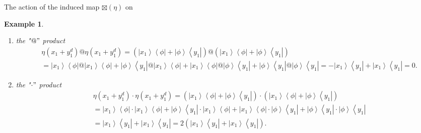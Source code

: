 \documentclass[aps,preprint]{revtex4}%
\newtheorem{example}[theorem]{Example}
\begin{document}
The action of the induced map $\boxtimes\left(  \eta\right)  $ on

\begin{example}
\begin{enumerate}
\item the "$@"$ product
\begin{align}
&  \eta\left(  x_{1}+y_{1}^{d}\right)  @\eta\left(  x_{1}+y_{1}^{d}\right)
=\left(  \left\vert x_{1}\right\rangle \left\langle \phi\right\vert
+\left\vert \phi\right\rangle \left\langle y_{1}\right\vert \right)  @\left(
\left\vert x_{1}\right\rangle \left\langle \phi\right\vert +\left\vert
\phi\right\rangle \left\langle y_{1}\right\vert \right) \\
&  =\left\vert x_{1}\right\rangle \left\langle \phi\right\vert @\left\vert
x_{1}\right\rangle \left\langle \phi\right\vert +\left\vert \phi\right\rangle
\left\langle y_{1}\right\vert @\left\vert x_{1}\right\rangle \left\langle
\phi\right\vert +\left\vert x_{1}\right\rangle \left\langle \phi\right\vert
@\left\vert \phi\right\rangle \left\langle y_{1}\right\vert +\left\vert
\phi\right\rangle \left\langle y_{1}\right\vert @\left\vert \phi\right\rangle
\left\langle y_{1}\right\vert =-\left\vert x_{1}\right\rangle \left\langle
y_{1}\right\vert +\left\vert x_{1}\right\rangle \left\langle y_{1}\right\vert
=0.
\end{align}


\item the "$\cdot"$ product%
\begin{align}
&  \eta\left(  x_{1}+y_{1}^{d}\right)  \cdot\eta\left(  x_{1}+y_{1}%
^{d}\right)  =\left(  \left\vert x_{1}\right\rangle \left\langle
\phi\right\vert +\left\vert \phi\right\rangle \left\langle y_{1}\right\vert
\right)  \cdot\left(  \left\vert x_{1}\right\rangle \left\langle
\phi\right\vert +\left\vert \phi\right\rangle \left\langle y_{1}\right\vert
\right) \\
&  =\left\vert x_{1}\right\rangle \left\langle \phi\right\vert \cdot\left\vert
x_{1}\right\rangle \left\langle \phi\right\vert +\left\vert \phi\right\rangle
\left\langle y_{1}\right\vert \cdot\left\vert x_{1}\right\rangle \left\langle
\phi\right\vert +\left\vert x_{1}\right\rangle \left\langle \phi\right\vert
\cdot\left\vert \phi\right\rangle \left\langle y_{1}\right\vert +\left\vert
\phi\right\rangle \left\langle y_{1}\right\vert \cdot\left\vert \phi
\right\rangle \left\langle y_{1}\right\vert \\
&  =\left\vert x_{1}\right\rangle \left\langle y_{1}\right\vert +\left\vert
x_{1}\right\rangle \left\langle y_{1}\right\vert =2\left(  \left\vert
x_{1}\right\rangle \left\langle y_{1}\right\vert +\left\vert x_{1}%
\right\rangle \left\langle y_{1}\right\vert \right)  .
\end{align}

\end{enumerate}
\end{example}
\end{document}
